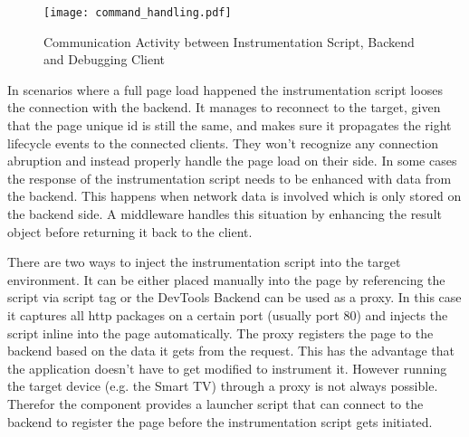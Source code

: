 \begin{figure}[htb]
  \centering
  \texttt{[image: command\_handling.pdf]}\\
  \caption{Communication Activity between Instrumentation Script, Backend and Debugging Client}\label{fig:command_handling}
\end{figure}

In scenarios where a full page load happened the instrumentation script looses the connection with
the backend. It manages to reconnect to the target, given that the page unique id is still the same,
and makes sure it propagates the right lifecycle events to the connected clients. They won't recognize
any connection abruption and instead properly handle the page load on their side. In some cases the
response of the instrumentation script needs to be enhanced with data from the backend. This happens
when network data is involved which is only stored on the backend side. A middleware handles this
situation by enhancing the result object before returning it back to the client.

There are two ways to inject the instrumentation script into the target environment. It can be either
placed manually into the page by referencing the script via script tag or the DevTools Backend can be
used as a proxy. In this case it captures all http packages on a certain port (usually port 80) and
injects the script inline into the page automatically. The proxy registers the page to the backend
based on the data it gets from the request. This has the advantage that the application doesn't have
to get modified to instrument it. However running the target device (e.g. the Smart TV) through a
proxy is not always possible. Therefor the component provides a launcher script that can connect to
the backend to register the page before the instrumentation script gets initiated.

